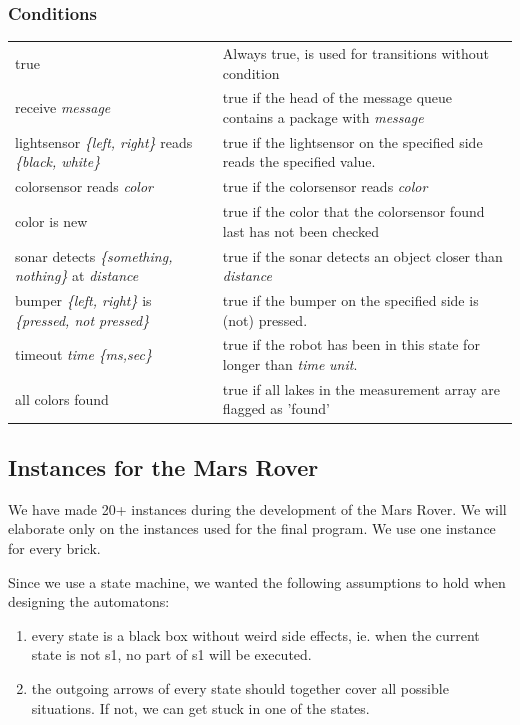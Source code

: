 \documentclass[11pt,a4paper]{article}
\begin{document}
\subsubsection{Conditions}
\begin{tabular}{p{6cm}p{10cm}}
true & Always true, is used for transitions without condition\\
receive \emph{message} & true if the head of the message queue contains a package with \emph{message}\\
lightsensor \emph{\{left, right\}} reads \emph{\{black, white\}} & true if the lightsensor on the specified side reads the specified value.\\
colorsensor reads \emph{color} & true if the colorsensor reads \emph{color}\\
color is new & true if the color that the colorsensor found last has not been checked\\
sonar detects \emph{\{something, nothing\}} at \emph{distance} & true if the sonar detects an object closer than \emph{distance}\\
bumper \emph{\{left, right\}} is \emph{\{pressed, not pressed\}} & true if the bumper on the specified side is (not) pressed.\\
timeout \emph{time} \emph{\{ms,sec\}} & true if the robot has been in this state for longer than \emph{time} \emph{unit}.\\
all colors found & true if all lakes in the measurement array are flagged as 'found'\\
\end{tabular}

\subsection*{Instances for the Mars Rover}
We have made 20+ instances during the development of the Mars Rover. We will elaborate only on the instances used for the final program.
We use one instance for every brick.

Since we use a state machine, we wanted the following assumptions to hold when designing the automatons:
\begin{enumerate}
\item every state is a black box without weird side effects, ie. when the current state is not s1, no part of s1 will be executed.
\item the outgoing arrows of every state should together cover all possible situations. If not, we can get stuck in one of the states.
\end{enumerate}
\end{document}
